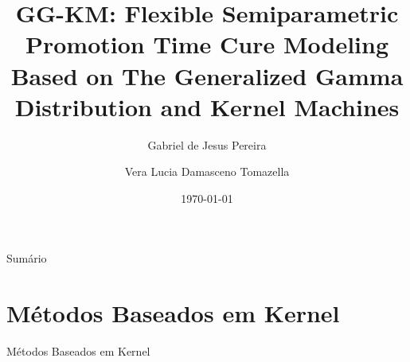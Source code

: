 \documentclass[aspectratio=169,t,xcolor=table]{beamer}
\title[Inf PIPGES]{GG-KM: Flexible Semiparametric
Promotion Time Cure Modeling Based on
The Generalized Gamma Distribution and
Kernel Machines}
\author[Discente, Docente]{Gabriel de Jesus Pereira\inst{1} \and Vera Lucia Damasceno Tomazella}
\institute[UFSCar]
{
  \inst{1}%
  Mestrado - PIPGEs\\
  UFSCar \& USP \\
}
\date{\today}
\begin{document}
\frame[noframenumbering]{\titlepage}



\begin{frame}{Sumário}
\tableofcontents
\end{frame}



\section{Métodos Baseados em Kernel}
\begin{frame}{Métodos Baseados em Kernel}
\end{frame}








\end{document}
